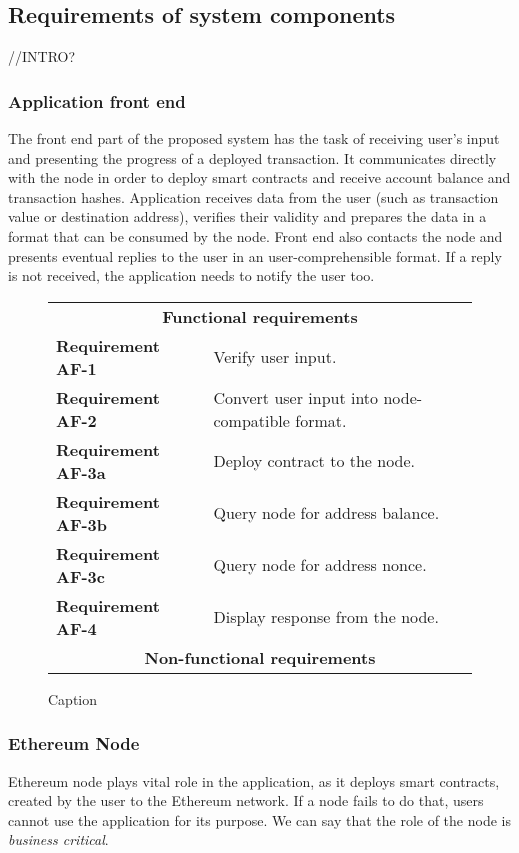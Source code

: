 \subsection{Requirements of system components}

//INTRO?

\subsubsection{Application front end}
The front end part of the proposed system has the task of receiving user's input and presenting the progress of a deployed transaction. It communicates directly with the node in order to deploy smart contracts and receive account balance and transaction hashes. Application receives data from the user (such as transaction value or destination address), verifies their validity and prepares the data in a format that can be consumed by the node. Front end also contacts the node and presents eventual replies to the user in an user-comprehensible format. If a reply is not received, the application needs to notify the user too.

\begin{figure}[ht]
    \begin{framed}
    \begin{tabular}{l l}
        \multicolumn{2}{c}{\textbf{Functional requirements}}\\
        \textbf{Requirement AF-1}&Verify user input.\\
        \textbf{Requirement AF-2}&Convert user input into node-compatible format.\\
        \textbf{Requirement AF-3a}&Deploy contract to the node.\\
        \textbf{Requirement AF-3b}&Query node for address balance.\\
        \textbf{Requirement AF-3c}&Query node for address nonce.\\
        \textbf{Requirement AF-4}&Display response from the node.\\
        
        \multicolumn{2}{c}{\textbf{Non-functional requirements}}
    \end{tabular}
    \end{framed}
   
    \caption{Caption}
    \label{fig:my_label}
\end{figure}

\subsubsection{Ethereum Node}
Ethereum node plays vital role in the application, as it deploys smart contracts, created by the user to the Ethereum network. If a node fails to do that, users cannot use the application for its purpose. We can say that the role of the node is \textit{business critical}.

